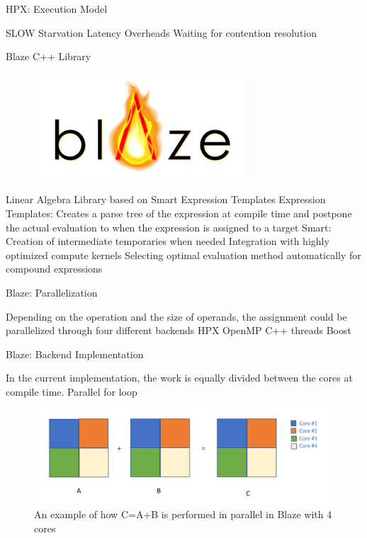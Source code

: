 \documentclass[10pt]{beamer}
\begin{document}
\begin{frame}{HPX: Execution Model}
	\begin{outline}
		\1SLOW
		\2Starvation
		\2Latency
		\2Overheads
		\2Waiting for contention resolution
	\end{outline}
\end{frame}


\begin{frame}{Blaze C++ Library}
\begin{outline}
\begin{figure}[H]

	\includegraphics[width=0.22\linewidth]{images/blaze.png}
\end{figure}	
 Linear Algebra Library based on Smart Expression Templates
 \1Expression Templates:
	\2Creates a parse tree of the expression at compile time and postpone the actual evaluation to when the expression is assigned to a target
\1 Smart: 
	\2Creation of intermediate temporaries when needed
	\2Integration with highly optimized compute kernels
	\2Selecting optimal evaluation method automatically for compound expressions
\end{outline}
\end{frame}


\begin{frame}{Blaze: Parallelization}
	\begin{outline}
		Depending on the operation and the size of operands, the assignment could be parallelized through four different backends
		\1 HPX 
		\1OpenMP
		\1C++ threads
		\1Boost
	\end{outline}
\end{frame}

\begin{frame}{Blaze: Backend Implementation}
	\begin{outline}
		In the current implementation, the work is equally divided between the cores at compile time. 
		\1Parallel for loop
		\begin{figure}
			\centering
			\includegraphics[width=0.72\linewidth]{images/old_backend.png}
			\caption{An example of how C=A+B is performed in parallel in Blaze with 4 cores}	
		\end{figure}	

	\end{outline}
\end{frame}
\end{document}
